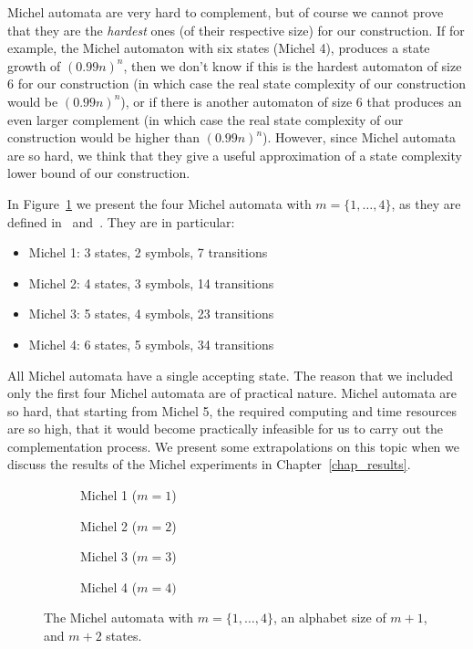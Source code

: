 Michel automata are very hard to complement, but of course we cannot prove that they are the \textit{hardest} ones (of their respective size) for our construction. If for example, the Michel automaton with six states (Michel 4), produces a state growth of $(0.99n)^n$, then we don't know if this is the hardest automaton of size 6 for our construction (in which case the real state complexity of our construction would be $(0.99n)^n$), or if there is another automaton of size 6 that produces an even larger complement (in which case the real state complexity of our construction would be higher than $(0.99n)^n$). However, since Michel automata are so hard, we think that they give a useful approximation of a state complexity lower bound of our construction.

In Figure~\ref{4_michel_automata} we present the four Michel automata with $m=\{1,\dots,4\}$, as they are defined in~\cite{michel1988} and~\cite{1996_thomas}. They are in particular:
\begin{itemize}
\item Michel 1: 3 states, 2 symbols,  7 transitions
\item Michel 2: 4 states, 3 symbols, 14 transitions
\item Michel 3: 5 states, 4 symbols, 23 transitions
\item Michel 4: 6 states, 5 symbols, 34 transitions
\end{itemize}

All Michel automata have a single accepting state. The reason that we included only the first four Michel automata are of practical nature. Michel automata are so hard, that starting from Michel 5, the required computing and time resources are so high, that it would become practically infeasible for us to carry out the complementation process. We present some extrapolations on this topic when we discuss the results of the Michel experiments in Chapter~\ref{chap_results}.

\newcommand{\subwidth}{0.42}
\begin{figure}[htb!]
\centering
  \begin{subfigure}[t]{\subwidth\textwidth}
  \MichelOne
  \caption{Michel 1 ($m=1$)}
  \end{subfigure}
  \begin{subfigure}[t]{\subwidth\textwidth}
  \MichelTwo
  \caption{Michel 2 ($m=2$)}
  \end{subfigure}

  \begin{subfigure}[b]{\subwidth\textwidth}
  \MichelThree
  \caption{Michel 3 ($m=3$)}
  \end{subfigure}
  \begin{subfigure}[b]{\subwidth\textwidth}
  \MichelFour
  \caption{Michel 4 ($m=4)$}
  \end{subfigure}
\caption{The Michel automata with $m = \{1,\dots,4\}$, an alphabet size of $m+1$, and $m+2$ states.}
\label{4_michel_automata}
\end{figure}


